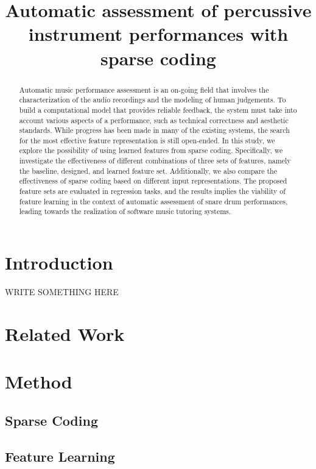 \documentclass{article}
\title{Automatic assessment of percussive instrument performances with sparse coding}
\begin{document}
%
\maketitle
%
\begin{abstract}
Automatic music performance assessment is an on-going field that involves the characterization of the audio recordings and the modeling of human judgements. To build a computational model that provides reliable feedback, the system must take into account various aspects of a performance, such as technical correctness and aesthetic standards. While progress has been made in many of the existing systems, the search for the most effective feature representation is still open-ended. In this study, we explore the possibility of using learned features from sparse coding. Specifically, we investigate the effectiveness of different combinations of three sets of features, namely the baseline, designed, and learned feature set. Additionally, we also compare the effectiveness of sparse coding based on different input representations. The proposed feature sets are evaluated in regression tasks, and the results implies the viability of feature learning in the context of automatic assessment of snare drum performances, leading towards the realization of software music tutoring systems.   
\end{abstract}
%
\section{Introduction}

WRITE SOMETHING HERE \cite{Author:00}

\section{Related Work}

\section{Method}

\subsection{Sparse Coding}

\subsection{Feature Learning}
\end{document}
